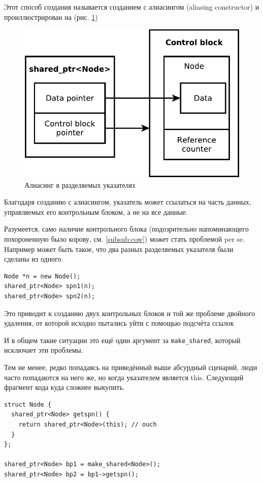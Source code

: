 \documentclass[a4paper,12pt,oneside]{book}
\begin{document}
Этот способ создания называется созданием с алиасингом (aliasing constructor) и проиллюстрирован на (рис. \ref{fig:smartptrs-aliased})

\begin{figure}[ht]
\centering
\includegraphics[width=1.0\textwidth]{illustrations/smartptrs-aliased-crop.pdf}
\caption{Алиасинг в разделяемых указателях}
\label{fig:smartptrs-aliased}
\end{figure}

Благодаря созданию с алиасингом, указатель может ссылаться на часть данных, управляемых его контрольным блоком, а не на все данные.

Разумеется, само наличие контрольного блока (подозрительно напоминающего похороненную было корову, см. \ref{subsub:cow}) может стать проблемой per se. Например может быть такое, что два разных разделяемых указателя были сделаны из одного.

\begin{lstlisting}
Node *n = new Node();
shared_ptr<Node> spn1(n);
shared_ptr<Node> spn2(n);
\end{lstlisting}

Это приводит к созданию двух контрольных блоков и той же проблеме двойного удаления, от которой исходно пытались уйти с помощью подсчёта ссылок

И в общем такие ситуации это ещё один аргумент за \lstinline!make_shared!, который исключает эти проблемы.

Тем не менее, редко попадаясь на приведённый выше абсурдный сценарий, люди часто попадаются на него же, но когда указателем является this. Следующий фрагмент кода куда сложнее выкупить.

\begin{lstlisting}
struct Node {
  shared_ptr<Node> getspn() {
    return shared_ptr<Node>(this); // ouch
  }
};

shared_ptr<Node> bp1 = make_shared<Node>();
shared_ptr<Node> bp2 = bp1->getspn();
\end{lstlisting}
\end{document}
